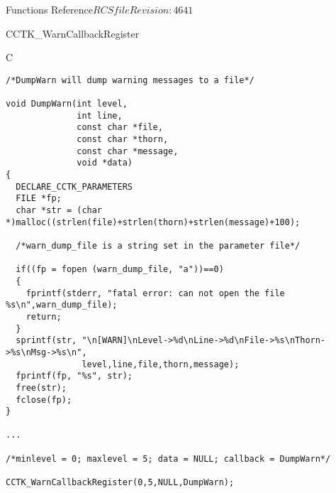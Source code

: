 \begin{cactuspart}{ Functions Reference}{$RCSfile$}{$Revision: 4641 $}
\begin{FunctionDescription}{CCTK\_WarnCallbackRegister}
\begin{SeeAlsoSection}
\end{SeeAlsoSection}

\begin{ExampleSection}
\begin{Example}{C}
\begin{verbatim}
/*DumpWarn will dump warning messages to a file*/

void DumpWarn(int level,
              int line,
              const char *file,
              const char *thorn,
              const char *message,
              void *data)
{
  DECLARE_CCTK_PARAMETERS
  FILE *fp;
  char *str = (char *)malloc((strlen(file)+strlen(thorn)+strlen(message)+100);

  /*warn_dump_file is a string set in the parameter file*/

  if((fp = fopen (warn_dump_file, "a"))==0)
  {
    fprintf(stderr, "fatal error: can not open the file %s\n",warn_dump_file);
    return;
  }
  sprintf(str, "\n[WARN]\nLevel->%d\nLine->%d\nFile->%s\nThorn->%s\nMsg->%s\n",
               level,line,file,thorn,message);
  fprintf(fp, "%s", str);
  free(str);
  fclose(fp);
}

...

/*minlevel = 0; maxlevel = 5; data = NULL; callback = DumpWarn*/

CCTK_WarnCallbackRegister(0,5,NULL,DumpWarn);
\end{verbatim}
\end{Example}
\end{ExampleSection}
\end{FunctionDescription}


\end{cactuspart}

